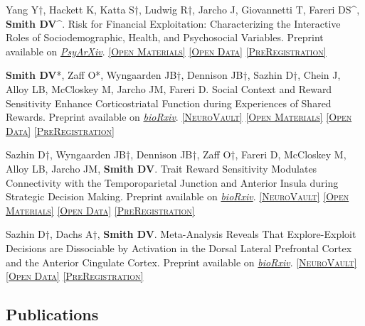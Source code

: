 \documentclass[11pt, letterpaper]{article}
\newcommand{\psyarxiv}[1]{\href{#1}{\textit{PsyArXiv}}}
\newcommand{\biorxiv}[1]{\href{#1}{\textit{bioRxiv}}}
\newcommand{\neurovault}[1]{\href{#1}{\scriptsize\textsc{[NeuroVault]}}}
\newcommand{\materials}[1]{\href{#1}{\scriptsize\textsc{[Open Materials]}}}
\newcommand{\data}[1]{\href{#1}{\scriptsize\textsc{[Open Data]}}}
\newcommand{\preregistration}[1]{\href{#1}{\scriptsize\textsc{[PreRegistration]}}}
\begin{document}
\begin{hangparas}{.5in}{1}

Yang Y†, Hackett K, Katta S†, Ludwig R†, Jarcho J, Giovannetti T, Fareri DS\^{}, \textbf{Smith DV}\^{}. Risk for Financial Exploitation: Characterizing the Interactive Roles of Sociodemographic, Health, and Psychosocial Variables. Preprint available on \psyarxiv{https://doi.org/10.31234/osf.io/pb9ts}. \materials{https://osf.io/hd5nx/} \data{https://osf.io/hd5snx/} \preregistration{https://osf.io/hd5nx/}

\textbf{Smith DV}*, Zaff O*, Wyngaarden JB†, Dennison JB†, Sazhin D†, Chein J, Alloy LB, McCloskey M, Jarcho JM, Fareri D. Social Context and Reward Sensitivity Enhance Corticostriatal Function during Experiences of Shared Rewards. Preprint available on \biorxiv{https://doi.org/10.1101/2023.10.19.562908}. \neurovault{https://neurovault.org/collections/15006/} \materials{https://github.com/DVS-Lab/istart-sharedreward} \data{https://openneuro.org/datasets/ds004920} \preregistration{https://aspredicted.org/blind.php?x=SFX_MXL}

Sazhin D†, Wyngaarden JB†, Dennison JB†, Zaff O†, Fareri D, McCloskey M, Alloy LB, Jarcho JM, \textbf{Smith DV}. Trait Reward Sensitivity Modulates Connectivity with the Temporoparietal Junction and Anterior Insula during Strategic Decision Making. Preprint available on \biorxiv{https://doi.org/10.1101/2023.10.19.563125}. \neurovault{https://identifiers.org/neurovault.collection:15045} \materials{https://github.com/DVS-Lab/istart-ugdg} \data{https://openneuro.org/datasets/ds004920} \preregistration{https://aspredicted.org/55gd8.pdf}

Sazhin D†, Dachs A†, \textbf{Smith DV}. Meta-Analysis Reveals That Explore-Exploit Decisions are Dissociable by Activation in the Dorsal Lateral Prefrontal Cortex and the Anterior Cingulate Cortex. Preprint available on \biorxiv{https://doi.org/10.1101/2023.10.21.563317}.  \neurovault{https://neurovault.org/collections/15560/} \data{https://osf.io/86kp9/} \preregistration{https://aspredicted.org/7hc7c.pdf} \\



\end{hangparas}

\subsection*{Publications}
\end{document}
